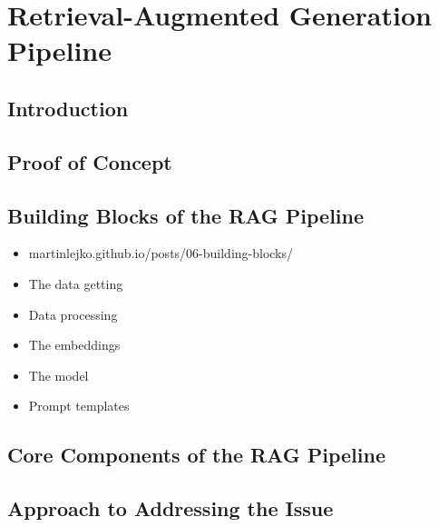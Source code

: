 \chapter{Retrieval-Augmented Generation Pipeline}

\section{Introduction}
\section{Proof of Concept}
\section{Building Blocks of the RAG Pipeline}
\begin{itemize}
    \item martinlejko.github.io/posts/06-building-blocks/
    \item The data getting
    \item Data processing
    \item The embeddings
    \item The model
    \item Prompt templates
\end{itemize}
\section{Core Components of the RAG Pipeline}
\section{Approach to Addressing the Issue}
